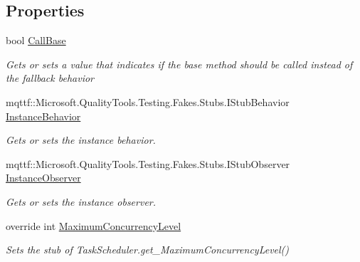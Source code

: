 \subsection*{Properties}
\begin{DoxyCompactItemize}
\item 
bool \hyperlink{class_system_1_1_threading_1_1_tasks_1_1_fakes_1_1_stub_task_scheduler_a40e08f6a8e4f070679cf2316fbb5bf28}{Call\-Base}
\begin{DoxyCompactList}\small\item\em Gets or sets a value that indicates if the base method should be called instead of the fallback behavior\end{DoxyCompactList}\item 
mqttf\-::\-Microsoft.\-Quality\-Tools.\-Testing.\-Fakes.\-Stubs.\-I\-Stub\-Behavior \hyperlink{class_system_1_1_threading_1_1_tasks_1_1_fakes_1_1_stub_task_scheduler_a1cafe643c8a0b41395c17941c71d6f93}{Instance\-Behavior}
\begin{DoxyCompactList}\small\item\em Gets or sets the instance behavior.\end{DoxyCompactList}\item 
mqttf\-::\-Microsoft.\-Quality\-Tools.\-Testing.\-Fakes.\-Stubs.\-I\-Stub\-Observer \hyperlink{class_system_1_1_threading_1_1_tasks_1_1_fakes_1_1_stub_task_scheduler_a3c14e2fa639f268134c433cddee506ee}{Instance\-Observer}
\begin{DoxyCompactList}\small\item\em Gets or sets the instance observer.\end{DoxyCompactList}\item 
override int \hyperlink{class_system_1_1_threading_1_1_tasks_1_1_fakes_1_1_stub_task_scheduler_a8de52c9f854709533d5d3e5f4ef4e6d6}{Maximum\-Concurrency\-Level}
\begin{DoxyCompactList}\small\item\em Sets the stub of Task\-Scheduler.\-get\-\_\-\-Maximum\-Concurrency\-Level()\end{DoxyCompactList}\end{DoxyCompactItemize}


